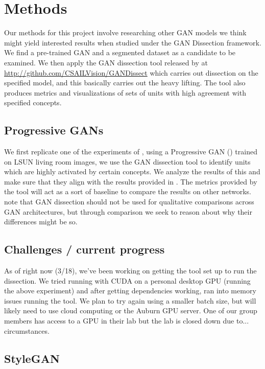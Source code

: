 \documentclass{article}
\begin{document}
\section{Methods}

Our methods for this project involve researching other GAN models we think might yield interested results when studied under the GAN Dissection \cite{gandissect2019} framework. We find a pre-trained GAN and a segmented dataset as a candidate to be examined. We then apply the GAN dissection tool released by \citet{gandissect2019} at \url{http://github.com/CSAILVision/GANDissect} which carries out dissection on the specified model, and this basically carries out the heavy lifting. The tool also produces metrics and visualizations of sets of units with high agreement with specified concepts. 

\subsection{Progressive GANs}

We first replicate one of the experiments of \citet{gandissect2019}, using a Progressive GAN (\cite{progan2017}) trained on LSUN living room images, we use the GAN dissection tool to identify units which are highly activated by certain concepts. We analyze the results of this and make sure that they align with the results provided in \citet{gandissect2019}. The metrics provided by the tool will act as a sort of baseline to compare the results on other networks. \citet{gandissect2019} note that GAN dissection should not be used for qualitative comparisons across GAN architectures, but through comparison we seek to reason about why their differences might be so.

\subsection{Challenges / current progress}

As of right now (3/18), we've been working on getting the tool set up to run the dissection. We tried running with CUDA on a personal desktop GPU (running the above experiment) and after getting dependencies working, ran into memory issues running the tool. We plan to try again using a smaller batch size, but will likely need to use cloud computing or the Auburn GPU server. One of our group members has access to a GPU in their lab but the lab is closed down due to... circumstances. 

\subsection{StyleGAN }
\end{document}
